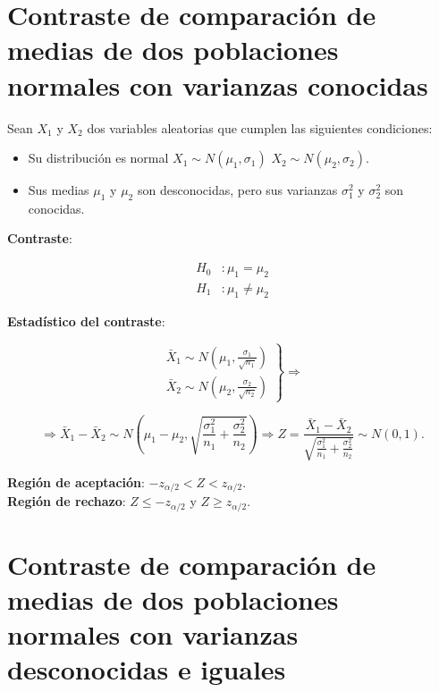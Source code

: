 \documentclass[
  a4paper,
]{scrreport}
\providecommand{\tightlist}{%
  \setlength{\itemsep}{0pt}\setlength{\parskip}{0pt}}\usepackage{longtable,booktabs,array}
\theoremstyle{definition}
\theoremstyle{definition}
\theoremstyle{plain}
\theoremstyle{remark}
\begin{document}
\hypertarget{contraste-de-comparaciuxf3n-de-medias-de-dos-poblaciones-normales-con-varianzas-conocidas}{%
\section{Contraste de comparación de medias de dos poblaciones normales
con varianzas
conocidas}\label{contraste-de-comparaciuxf3n-de-medias-de-dos-poblaciones-normales-con-varianzas-conocidas}}

Sean \(X_1\) y \(X_2\) dos variables aleatorias que cumplen las
siguientes condiciones:

\begin{itemize}
\tightlist
\item
  Su distribución es normal \(X_1\sim N(\mu_1,\sigma_1)\)
  \(X_2\sim N(\mu_2,\sigma_2)\).
\item
  Sus medias \(\mu_1\) y \(\mu_2\) son desconocidas, pero sus varianzas
  \(\sigma^2_1\) y \(\sigma^2_2\) son conocidas.
\end{itemize}

\textbf{Contraste}:

\[
\begin{aligned}
H_0 &: \mu_1=\mu_2 \\
H_1 &: \mu_1\neq \mu_2
\end{aligned}
\]

\textbf{Estadístico del contraste}:

\[
\left.
\begin{array}{l}
\bar{X}_1\sim N\left(\mu_1,\frac{\sigma_1}{\sqrt{n_1}} \right) \\
\bar{X}_2\sim N\left(\mu_2,\frac{\sigma_2}{\sqrt{n_2}} \right)
\end{array}
\right\}
\Rightarrow
\]

\[
\Rightarrow
\bar{X}_1-\bar{X}_2 \sim N\left(\mu_1-\mu_2,\sqrt{\frac{\sigma^2_1}{n_1}+\frac{\sigma^2_2}{n_2}}\right)
\Rightarrow Z= \frac{\bar{X}_1-\bar{X}_2}{\sqrt{\frac{\sigma^2_1}{n_1}+\frac{\sigma^2_2}{n_2}}}\sim
N(0,1).
\]

\textbf{Región de aceptación}: \(-z_{\alpha/2}< Z < z_{\alpha/2}\).\\
\textbf{Región de rechazo}: \(Z\leq -z_{\alpha/2}\) y
\(Z\geq z_{\alpha/2}\).

\hypertarget{contraste-de-comparaciuxf3n-de-medias-de-dos-poblaciones-normales-con-varianzas-desconocidas-e-iguales}{%
\section{Contraste de comparación de medias de dos poblaciones normales
con varianzas desconocidas e
iguales}\label{contraste-de-comparaciuxf3n-de-medias-de-dos-poblaciones-normales-con-varianzas-desconocidas-e-iguales}}
\end{document}
